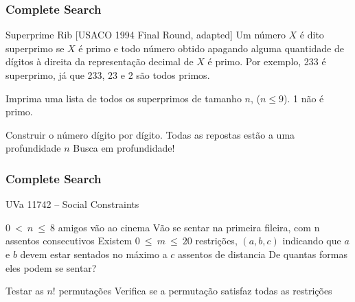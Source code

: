\begin{frame}
\frametitle{Complete Search}
\begin{block}{Superprime Rib [USACO 1994 Final Round, adapted]}
Um número $X$ é dito superprimo se $X$ é primo e todo número obtido apagando alguma quantidade de dígitos à direita da representação decimal de $X$ é primo. Por exemplo, 233 é superprimo, já que 233, 23 e 2 são todos primos.
\begin{itemize}
	\bitem Imprima uma lista de todos os superprimos de tamanho $n$, ($n \leq 9$). 1 não é primo.
\end{itemize}
\end{block}

\pause
\begin{block}{}
\begin{itemize}[<+->]
	\bitem Construir o número dígito por dígito.
	\bitem Todas as repostas estão a uma profundidade $n$
	\bitem Busca em profundidade!
\end{itemize}
\end{block}

\end{frame}

\begin{frame}
\frametitle{Complete Search}
\begin{block}{UVa 11742 -- Social Constraints}
\begin{itemize}
	\bitem $0\ <\ n\ \leq\ 8$ amigos vão ao cinema
	\bitem Vão se sentar na primeira fileira, com n assentos consecutivos
	\bitem Existem $0\ \leq\ m\ \leq\ 20$ restrições, $(a,b,c)$ indicando que $a$ e $b$ devem estar sentados no máximo a $c$ assentos de distancia
	\bitem De quantas formas eles podem se sentar?
\end{itemize}
\end{block}
\pause
\begin{block}{}
\begin{itemize}
	\bitem Testar as $n!$ permutações \texttt{\color{ccomments}{/* C++ -- next\_permutation() */}}
	\bitem Verifica se a permutação satisfaz todas as restrições
\end{itemize}
\end{block}
\end{frame}

